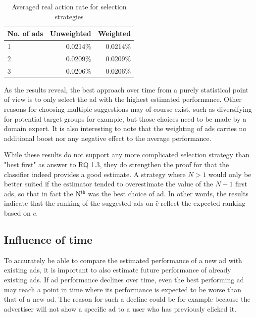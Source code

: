 \documentclass{sig-alternate}
\newcommand{\superscript}[1]{\ensuremath{^{\textrm{#1}}}}
\begin{document}
\begin{table}
\begin{center}
	\begin{tabular}{  l | r  r  }
		\hline
		\textbf{No. of ads} & \textbf{Unweighted} & \textbf{Weighted} \\
		\hline
		1 & 0.0214\% & 0.0214\% \\
		2 & 0.0209\% & 0.0209\% \\
		3 & 0.0206\% & 0.0206\% \\
		\hline
	\end{tabular}
	\caption{Averaged real action rate for selection strategies}
	\label{tbl:SelectionStrategy}
\end{center}
\end{table}

As the results reveal, the best approach over time from a purely statistical point of view is to only select the ad with the highest estimated performance. Other reasons for choosing multiple suggestions may of course exist, such as diversifying for potential target groups for example, but those choices need to be made by a domain expert. It is also interesting to note that the weighting of ads carries no additional boost nor any negative effect to the average performance.

While these results do not support any more complicated selection strategy than "best first" as answer to RQ 1.3, they do strengthen the proof for that the classifier indeed provides a good estimate. A strategy where \(N > 1\) would only be better suited if the estimator tended to overestimate the value of the \(N-1\) first ads, so that in fact the N\superscript{th} was the best choice of ad. In other words, the results indicate that the ranking of the suggested ads on \(\hat{c}\) reflect the expected ranking based on \(c\).

\subsection{Influence of time}
To accurately be able to compare the estimated performance of a new ad with existing ads, it is important to also estimate future performance of already existing ads. If ad performance declines over time, even the best performing ad may reach a point in time where its performance is expected to be worse than that of a new ad. The reason for such a decline could be for example because the advertiser will not show a specific ad to a user who has previously clicked it.
\end{document}

